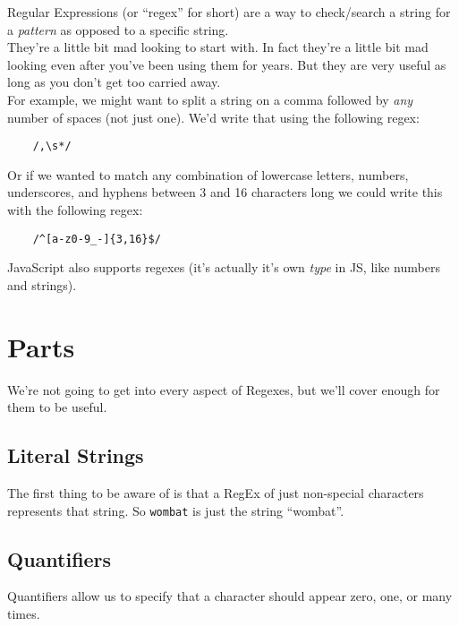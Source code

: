 Regular Expressions (or ``regex'' for short) are a way to check/search a string for a \textit{pattern} as opposed to a specific string.
\\

They're a little bit mad looking to start with. In fact they're a little bit mad looking even after you've been using them for years. But they are very useful as long as you don't get too carried away.
\\

For example, we might want to split a string on a comma followed by \textit{any} number of spaces (not just one). We'd write that using the following regex:

\begin{verbatim}
    /,\s*/
\end{verbatim}


Or if we wanted to match any combination of lowercase letters, numbers, underscores, and hyphens between 3 and 16 characters long we could write this with the following regex:

\begin{verbatim}
    /^[a-z0-9_-]{3,16}$/
\end{verbatim}

JavaScript also supports regexes (it's actually it's own \textit{type} in JS, like numbers and strings).

\pagebreak


\section{Parts}

We're not going to get into every aspect of Regexes, but we'll cover enough for them to be useful.

\subsection{Literal Strings}

The first thing to be aware of is that a RegEx of just non-special characters represents that string. So \texttt{wombat} is just the string ``wombat''.

\subsection{Quantifiers}

Quantifiers allow us to specify that a character should appear zero, one, or many times.

